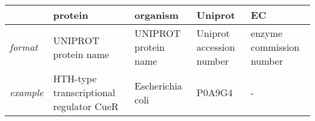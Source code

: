 \begin{tabular}{lL{3cm}L{3cm}L{2cm}L{1.8cm}}
  \toprule
  & protein & organism & Uniprot & EC \\
  \midrule
  \textit{format} & UNIPROT protein name & UNIPROT protein name & Uniprot accession number & enzyme commission number \\
  \textit{example} & HTH-type transcriptional regulator CueR & Escherichia coli & P0A9G4 & - \\
  \bottomrule
\end{tabular}

